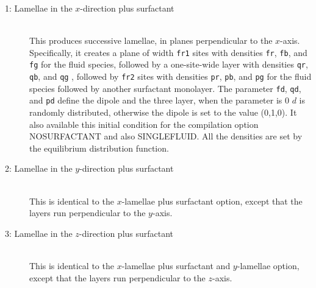 \documentclass[a4paper]{article}
\begin{document}
\begin{description}
\item[1: Lamellae in the $x$-direction plus surfactant]\ \\
  This produces successive lamellae, in planes perpendicular to the
  $x$-axis. Specifically, it creates a plane of width {\tt fr1} sites with
  densities {\tt fr}, {\tt fb}, and {\tt fg} for the fluid species, followed
  by a one-site-wide layer with densities {\tt qr}, {\tt qb}, and {\tt qg} ,
  followed by {\tt fr2} sites with densities {\tt pr}, {\tt pb}, and {\tt pg}
  for the fluid species followed by another surfactant monolayer. The
  parameter {\tt fd}, {\tt qd}, and {\tt pd} define the dipole and the three
  layer, when the parameter is 0 $d$ is randomly distributed, otherwise the
  dipole is set to the value (0,1,0). It also available this initial condition for
  the compilation option NOSURFACTANT and also SINGLEFLUID. All the densities
  are set by the equilibrium distribution function.

\item[2: Lamellae in the $y$-direction plus surfactant]\ \\
  This is identical to the $x$-lamellae plus surfactant option, except that
  the layers run perpendicular to the $y$-axis. 

\item[3: Lamellae in the $z$-direction plus surfactant]\ \\
  This is identical to the $x$-lamellae plus surfactant and $y$-lamellae
  option, except that the layers run perpendicular to the $z$-axis.




\end{description}
\end{document}
